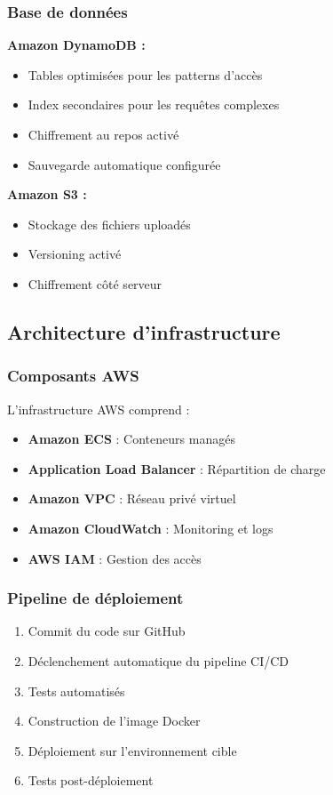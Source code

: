 \subsubsection{Base de données}

\textbf{Amazon DynamoDB :}
\begin{itemize}
    \item Tables optimisées pour les patterns d'accès
    \item Index secondaires pour les requêtes complexes
    \item Chiffrement au repos activé
    \item Sauvegarde automatique configurée
\end{itemize}

\textbf{Amazon S3 :}
\begin{itemize}
    \item Stockage des fichiers uploadés
    \item Versioning activé
    \item Chiffrement côté serveur
\end{itemize}

\subsection{Architecture d'infrastructure}

\subsubsection{Composants AWS}

L'infrastructure AWS comprend :

\begin{itemize}
    \item \textbf{Amazon ECS} : Conteneurs managés
    \item \textbf{Application Load Balancer} : Répartition de charge
    \item \textbf{Amazon VPC} : Réseau privé virtuel
    \item \textbf{Amazon CloudWatch} : Monitoring et logs
    \item \textbf{AWS IAM} : Gestion des accès
\end{itemize}

\subsubsection{Pipeline de déploiement}

\begin{enumerate}
    \item Commit du code sur GitHub
    \item Déclenchement automatique du pipeline CI/CD
    \item Tests automatisés
    \item Construction de l'image Docker
    \item Déploiement sur l'environnement cible
    \item Tests post-déploiement
\end{enumerate}


